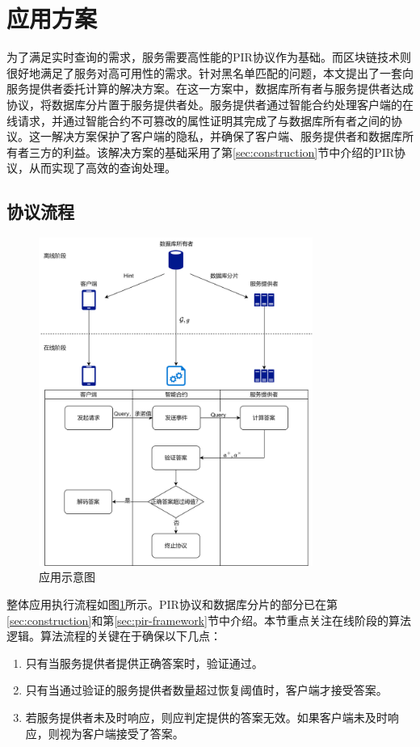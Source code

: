 \section{应用方案}
为了满足实时查询的需求，服务需要高性能的PIR协议作为基础。而区块链技术则很好地满足了服务对高可用性的需求。针对黑名单匹配的问题，本文提出了一套向服务提供者委托计算的解决方案。在这一方案中，数据库所有者与服务提供者达成协议，将数据库分片置于服务提供者处。服务提供者通过智能合约处理客户端的在线请求，并通过智能合约不可篡改的属性证明其完成了与数据库所有者之间的协议。这一解决方案保护了客户端的隐私，并确保了客户端、服务提供者和数据库所有者三方的利益。该解决方案的基础采用了第\ref{sec:construction}节中介绍的PIR协议，从而实现了高效的查询处理。
\subsection{协议流程}

\begin{figure}
    \centering
    \includegraphics[width=0.8\textwidth]{figure/应用示意图.png}
    \caption{应用示意图}
    \label{fig:pir-application-lane}
\end{figure}

整体应用执行流程如图\ref{fig:pir-application-lane}所示。PIR协议和数据库分片的部分已在第\ref{sec:construction}和第\ref{sec:pir-framework}节中介绍。本节重点关注在线阶段的算法逻辑。算法流程的关键在于确保以下几点：
\begin{enumerate}
    \item 只有当服务提供者提供正确答案时，验证通过。
    \item 只有当通过验证的服务提供者数量超过恢复阈值时，客户端才接受答案。
    \item 若服务提供者未及时响应，则应判定提供的答案无效。如果客户端未及时响应，则视为客户端接受了答案。
\end{enumerate}

